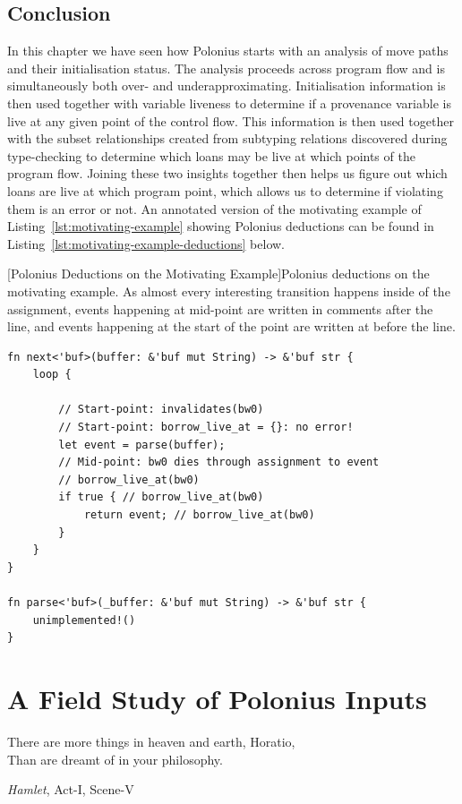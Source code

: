 \documentclass[11pt,a4paper,twoside,openany,draft]{report}
\newenvironment{sourcecode}{\captionsetup{type=listing}}{}
\begin{document}
\section{Conclusion}\label{sec:implementation:conclusion}

In this chapter we have seen how Polonius starts with an analysis of move paths
and their initialisation status. The analysis proceeds across program flow and
is simultaneously both over- and underapproximating. Initialisation information
is then used together with variable liveness to determine if a provenance
variable is live at any given point of the control flow. This information is
then used together with the subset relationships created from subtyping
relations discovered during type-checking to determine which loans may be live
at which points of the program flow. Joining these two insights together then
helps us figure out which loans are live at which program point, which allows us
to determine if violating them is an error or not. An annotated version of the
motivating example of Listing~\ref{lst:motivating-example} showing Polonius
deductions can be found in Listing~\ref{lst:motivating-example-deductions}
below.


\begin{sourcecode}
  [Polonius Deductions on the Motivating Example]{Polonius
    deductions on the motivating
    example. As almost every interesting transition happens inside of the
    assignment, events happening at mid-point are written in comments after the
    line, and events happening at the start of the point are written at before
    the line.}\label{lst:motivating-example-deductions}
\begin{verbatim}
fn next<'buf>(buffer: &'buf mut String) -> &'buf str {
    loop {

        // Start-point: invalidates(bw0)
        // Start-point: borrow_live_at = {}: no error!
        let event = parse(buffer); 
        // Mid-point: bw0 dies through assignment to event
        // borrow_live_at(bw0)
        if true { // borrow_live_at(bw0)
            return event; // borrow_live_at(bw0)
        }
    }
}

fn parse<'buf>(_buffer: &'buf mut String) -> &'buf str {
    unimplemented!()
}
\end{verbatim}
\end{sourcecode}


\chapter{A Field Study of Polonius Inputs}\label{sec:field-study-borrow}
\epigraph{There are more things in heaven and earth, Horatio,\\
  Than are dreamt of in your philosophy.}{\textit{Hamlet}, Act-I, Scene-V}
\end{document}
